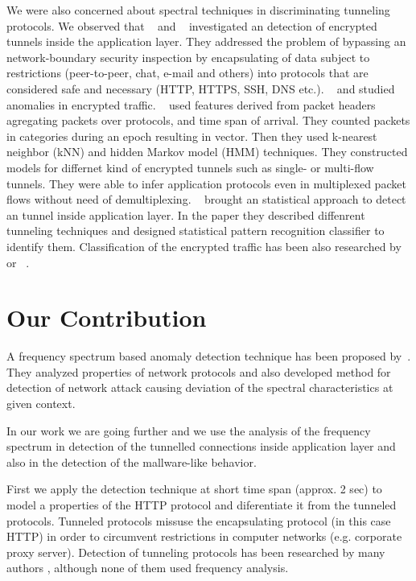 We were also concerned about spectral techniques in discriminating tunneling protocols. We
observed that
~\cite{wright2006inferring} and ~\cite{dusi2009tunnel} 
investigated an detection of encrypted tunnels inside the application layer. 
They addressed the problem of bypassing an network-boundary
security inspection by encapsulating of data subject to restrictions 
(peer-to-peer, chat, e-mail and others) into protocols that are considered safe 
and necessary (HTTP, HTTPS, SSH, DNS etc.). 
~\cite{estevez2004measuring}  and  
\cite{yamada2007intrusion} studied anomalies in encrypted traffic.
%
~\cite{wright2006inferring} used features derived from packet headers 
agregating packets over protocols, and time span of arrival. They counted packets in 
categories during an epoch
resulting in vector. Then they used k-nearest neighbor (kNN) and hidden Markov model 
(HMM) techniques. They constructed models for differnet kind of encrypted tunnels 
such as single- or multi-flow tunnels. They were able to infer application protocols even in
multiplexed packet flows without need of demultiplexing.
%
~\cite{dusi2009tunnel} brought an statistical approach 
to detect an tunnel inside application layer.
In the paper they described diffenrent tunneling techniques and designed statistical pattern recognition 
classifier to identify them. Classification of the encrypted traffic has been also researched by  
\citep{ingham2007comparing,ingham2007anomaly} or ~\cite{alshammari2009machine}.
%

\section{Our Contribution}

A frequency spectrum based anomaly detection technique has been proposed by~\cite{he2004spectral,chen2007spectral,chen2007tcp}.
They analyzed properties of network protocols and also developed method for detection of network attack
causing deviation of the spectral characteristics at given context.

In our work we are going further and we use the analysis of the frequency spectrum in detection of the tunnelled connections
inside application layer and also in the detection of the mallware-like behavior. 

First we apply the detection technique at short time span (approx. 2 sec) to model a properties of the HTTP protocol and diferentiate it from
the tunneled protocols. Tunneled protocols missuse the encapsulating protocol (in this case HTTP) in order to circumvent restrictions in computer networks 
(e.g. corporate proxy server). Detection of tunneling protocols has been researched by many authors 
\cite{wright2006inferring,yamada2007intrusion,estevez2004measuring,ingham2007comparing,ingham2007anomaly,alshammari2009machine,dusi2009tunnel}, 
although none of them used frequency analysis.

